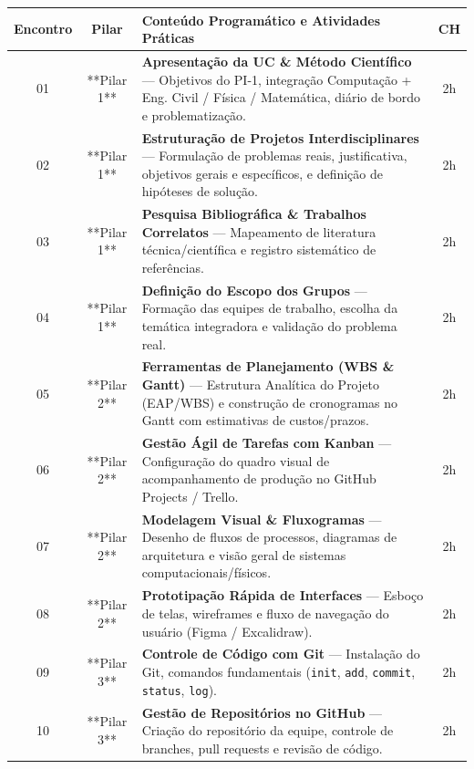 \documentclass[12pt,a4paper]{article}
\begin{document}
\begin{table}[H]
\centering
\small
\begin{tabularx}{\textwidth}{|c|c|X|c|}
\hline
\rowcolor{cinzaCabecalho}
\textbf{Encontro} & \textbf{Pilar} & \textbf{Conteúdo Programático e Atividades Práticas} & \textbf{CH} \\ \hline
\rowcolor{cinzaLinha}
01 & **Pilar 1** & \textbf{Apresentação da UC \& Método Científico} — Objetivos do PI-1, integração Computação + Eng. Civil / Física / Matemática, diário de bordo e problematização. & 2h \\ \hline
02 & **Pilar 1** & \textbf{Estruturação de Projetos Interdisciplinares} — Formulação de problemas reais, justificativa, objetivos gerais e específicos, e definição de hipóteses de solução. & 2h \\ \hline
\rowcolor{cinzaLinha}
03 & **Pilar 1** & \textbf{Pesquisa Bibliográfica \& Trabalhos Correlatos} — Mapeamento de literatura técnica/científica e registro sistemático de referências. & 2h \\ \hline
04 & **Pilar 1** & \textbf{Definição do Escopo dos Grupos} — Formação das equipes de trabalho, escolha da temática integradora e validação do problema real. & 2h \\ \hline
\rowcolor{cinzaLinha}
05 & **Pilar 2** & \textbf{Ferramentas de Planejamento (WBS \& Gantt)} — Estrutura Analítica do Projeto (EAP/WBS) e construção de cronogramas no Gantt com estimativas de custos/prazos. & 2h \\ \hline
06 & **Pilar 2** & \textbf{Gestão Ágil de Tarefas com Kanban} — Configuração do quadro visual de acompanhamento de produção no GitHub Projects / Trello. & 2h \\ \hline
\rowcolor{cinzaLinha}
07 & **Pilar 2** & \textbf{Modelagem Visual \& Fluxogramas} — Desenho de fluxos de processos, diagramas de arquitetura e visão geral de sistemas computacionais/físicos. & 2h \\ \hline
08 & **Pilar 2** & \textbf{Prototipação Rápida de Interfaces} — Esboço de telas, wireframes e fluxo de navegação do usuário (Figma / Excalidraw). & 2h \\ \hline
\rowcolor{cinzaLinha}
09 & **Pilar 3** & \textbf{Controle de Código com Git} — Instalação do Git, comandos fundamentais (\texttt{init}, \texttt{add}, \texttt{commit}, \texttt{status}, \texttt{log}). & 2h \\ \hline
10 & **Pilar 3** & \textbf{Gestão de Repositórios no GitHub} — Criação do repositório da equipe, controle de branches, pull requests e revisão de código. & 2h \\ \hline

\end{tabularx}
\end{table}
\end{document}
